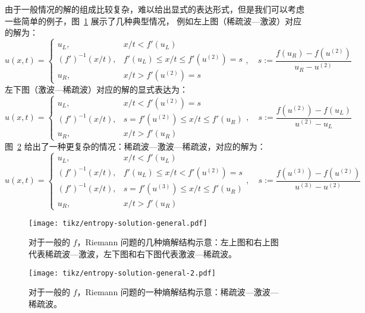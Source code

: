 由于一般情况的解的组成比较复杂，难以给出显式的表达形式，但是我们可以考虑一些简单的例子，图~\ref{fig:entropy-solution-general} 展示了几种典型情况，
例如左上图（稀疏波—激波）对应的解为：
\[
    u(x,t) ={}
    \begin{cases}
        u_L,            & x/t < f'(u_L)                       \\
        (f')^{-1}(x/t), & f'(u_L) \le x/t \le f'(u^{(2)}) = s \\
        u_R,            & x/t > f'(u^{(2)}) = s
    \end{cases}
    ,\quad
    s := \frac{f(u_R) - f(u^{(2)})}{u_R - u^{(2)}}
\]
左下图（激波—稀疏波）对应的解的显式表达为：
\[
    u(x,t) ={}
    \begin{cases}
        u_L,            & x/t < f'(u^{(2)}) = s               \\
        (f')^{-1}(x/t), & s = f'(u^{(2)}) \le x/t \le f'(u_R) \\
        u_R,            & x/t > f'(u_R)
    \end{cases}
    ,\quad
    s := \frac{f(u^{(2)}) - f(u_L)}{u^{(2)} - u_L}
\]
图~\ref{fig:entropy-solution-general-2} 给出了一种更复杂的情况：稀疏波—激波—稀疏波，对应的解为：
\[
    u(x,t) ={}
    \begin{cases}
        u_L,            & x/t < f'(u_L)                       \\
        (f')^{-1}(x/t), & f'(u_L) \le x/t < f'(u^{(2)}) = s   \\
        (f')^{-1}(x/t), & s = f'(u^{(3)}) \le x/t \le f'(u_R) \\
        u_R,            & x/t > f'(u_R)
    \end{cases}
    ,\quad
    s := \frac{f(u^{(3)}) - f(u^{(2)})}{u^{(3)} - u^{(2)}}
\]

\begin{figure}[htbp]
    \centering
    \texttt{[image: tikz/entropy-solution-general.pdf]}
    \caption{对于一般的 $f$，Riemann 问题的几种熵解结构示意：左上图和右上图代表稀疏波—激波，左下图和右下图代表激波—稀疏波。}
    \label{fig:entropy-solution-general}
\end{figure}

\begin{figure}[htbp]
    \centering
    \texttt{[image: tikz/entropy-solution-general-2.pdf]}
    \caption{对于一般的 $f$，Riemann 问题的一种熵解结构示意：稀疏波—激波—稀疏波。}
    \label{fig:entropy-solution-general-2}
\end{figure}


